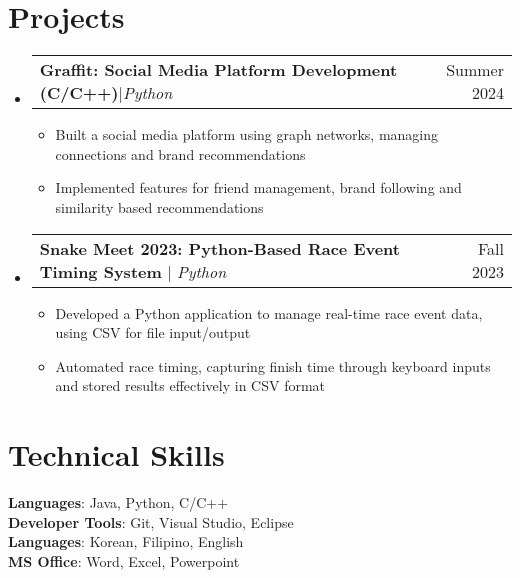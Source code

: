 \documentclass[letterpaper,11pt]{article}
\makeatletter
\newcommand{\resumeItem}[1]{
  \item\small{
    {#1 \vspace{-2pt}}
  }
}
\newcommand{\resumeProjectHeading}[2]{
    \item
    \begin{tabular*}{0.97\textwidth}{l@{\extracolsep{\fill}}r}
      \small#1 & #2 \\
    \end{tabular*}\vspace{-7pt}
}
\newcommand{\resumeSubHeadingListStart}{\begin{itemize}[leftmargin=0.15in, label={}]}
\newcommand{\resumeSubHeadingListEnd}{\end{itemize}}
\newcommand{\resumeItemListStart}{\begin{itemize}}
\newcommand{\resumeItemListEnd}{\end{itemize}\vspace{-5pt}}
\makeatother
\begin{document}
\section{Projects}
    \resumeSubHeadingListStart
      \resumeProjectHeading
            {\textbf{Graffit: Social Media Platform Development (C/C++)}$|$\emph{Python}}{Summer 2024}
      \resumeItemListStart
        \resumeItem{Built a social media platform using graph networks, managing connections and brand recommendations}
        \resumeItem{Implemented features for friend management, brand following and similarity based recommendations}
          \resumeItemListEnd
      \resumeProjectHeading
          {\textbf{Snake Meet 2023: Python-Based Race Event Timing System} $|$ \emph{Python}}{Fall 2023}
      \resumeItemListStart
        \resumeItem{Developed a Python application to manage real-time race event data, using CSV for file input/output}
        \resumeItem{Automated race timing, capturing finish time through keyboard inputs and stored results effectively in CSV format}
      \resumeItemListEnd
    \resumeSubHeadingListEnd



%
\section{Technical Skills}
 \begin{itemize}[leftmargin=0.15in, label={}]
    \small{\item{
     \textbf{Languages}{: Java, Python, C/C++} \\
     \textbf{Developer Tools}{: Git, Visual Studio, Eclipse} \\
     \textbf{Languages}{: Korean, Filipino, English}
     \\
     \textbf{MS Office}{: Word, Excel, Powerpoint}
    }}
 \end{itemize}


\end{document}
